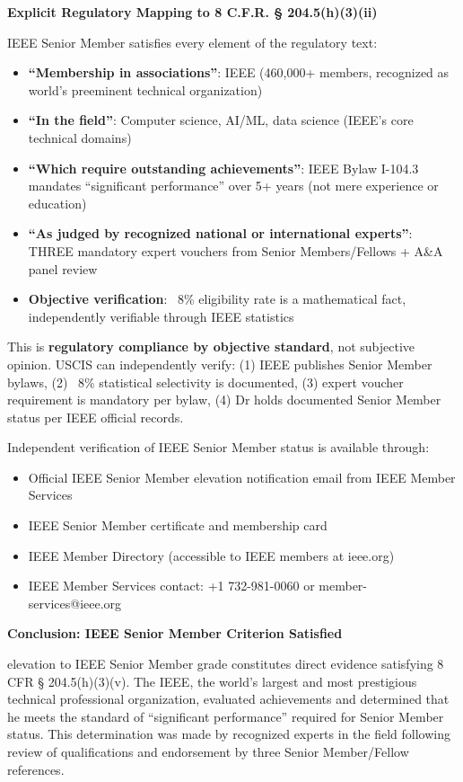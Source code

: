 \textbf{Explicit Regulatory Mapping to 8 C.F.R. § 204.5(h)(3)(ii)}

IEEE Senior Member satisfies every element of the regulatory text:

\begin{itemize}
    \item \textbf{``Membership in associations''}: IEEE (460,000+ members, recognized as world's preeminent technical organization)
    \item \textbf{``In the field''}: Computer science, AI/ML, data science (IEEE's core technical domains)
    \item \textbf{``Which require outstanding achievements''}: IEEE Bylaw I-104.3 mandates ``significant performance'' over 5+ years (not mere experience or education)
    \item \textbf{``As judged by recognized national or international experts''}: THREE mandatory expert vouchers from Senior Members/Fellows + A\&A panel review
    \item \textbf{Objective verification}: ~8\% eligibility rate is a mathematical fact, independently verifiable through IEEE statistics
\end{itemize}

This is \textbf{regulatory compliance by objective standard}, not subjective opinion. USCIS can independently verify: (1) IEEE publishes Senior Member bylaws, (2) ~8\% statistical selectivity is documented, (3) expert voucher requirement is mandatory per bylaw, (4) Dr holds documented Senior Member status per IEEE official records.

Independent verification of \drs IEEE Senior Member status is available through:
\begin{itemize}
    \item Official IEEE Senior Member elevation notification email from IEEE Member Services \cite{ieeeseniorresults}
    \item IEEE Senior Member certificate and membership card \cite{ieeemembercard}
    \item IEEE Member Directory (accessible to IEEE members at ieee.org)
    \item IEEE Member Services contact: +1 732-981-0060 or member-services@ieee.org
\end{itemize}

\textbf{Conclusion: IEEE Senior Member Criterion Satisfied}

\drs elevation to IEEE Senior Member grade constitutes direct evidence satisfying 8 CFR § 204.5(h)(3)(v). The IEEE, the world's largest and most prestigious technical professional organization, evaluated \drs achievements and determined that he meets the standard of ``significant performance'' required for Senior Member status. This determination was made by recognized experts in the field following review of \drs qualifications and endorsement by three Senior Member/Fellow references.

